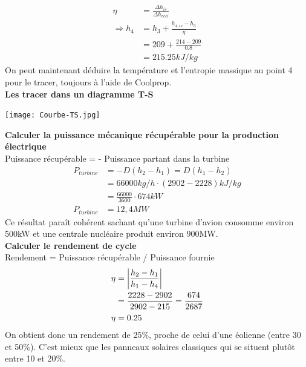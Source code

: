 \documentclass[12pt]{article}
\begin{document}
\begin{align*}
\eta &= \frac{\Delta h_{is}}{\Delta h_{reel}} \\
\Rightarrow h_4 &= h_3 + \frac{h_{4,is}-h_3}{\eta} \\
&= 209 + \frac{214-209}{0.8} \\
&= 215.25 kJ/kg
\end{align*}
On peut maintenant déduire la température et l'entropie massique au point 4 pour le tracer, toujours à l'aide de Coolprop.
\\

\textbf{Les tracer dans un diagramme T-S}

\begin{center}
  \texttt{[image: Courbe-TS.jpg]}
\end{center}


\textbf{Calculer la puissance mécanique récupérable pour la production électrique}
\\
Puissance récupérable = - Puissance partant dans la turbine
\begin{align*}
P_{turbine} &= - D(h_2-h_1) = D(h_1-h_2)\\
&= 66000kg/h\cdot(2902-2228)kJ/kg \\
&= \frac{66000}{3600} \cdot 674 kW \\
P_{turbine} &= 12,4 MW
\end{align*}
Ce résultat paraît cohérent sachant qu'une turbine d'avion consomme environ 500kW et une centrale nucléaire produit environ 900MW.
\\

\textbf{Calculer le rendement de cycle}
\\
Rendement = Puissance récupérable / Puissance fournie
\begin{align*}
\eta &= \displaystyle\left\lvert\frac{h_2-h_1}{h_1-h_4}\displaystyle\right\rvert\\
&= \frac{2228-2902}{2902-215} = \frac{674}{2687} \\
\eta &= 0.25
\end{align*}
On obtient donc un rendement de 25\%, proche de celui d'une éolienne (entre 30 et 50\%). C'est mieux que les panneaux solaires classiques qui se situent plutôt entre 10 et 20\%.
\end{document}
